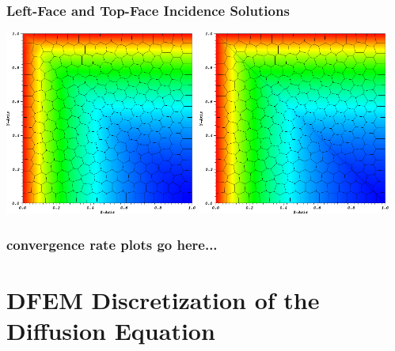 \documentclass[compress,10pt]{beamer}
\begin{document}
\begin{frame}[t]
{}
{
\frametitle{Left-Face and Top-Face Incidence Solutions}
\vspace{0.75cm}
\hspace*{0.25cm}
{}\includegraphics[width=0.475\textwidth]{images/PALeftTopSol_Poly.png} 
{}\includegraphics[width=0.475\textwidth]{images/PALeftTopSol_SplitPoly.png}
}
{
\frametitle{convergence rate plots go here...}
}
\end{frame}
\typeout{***********************************************************************************}
\section[MIP Form]{DFEM Discretization of the Diffusion Equation}
\end{document}
